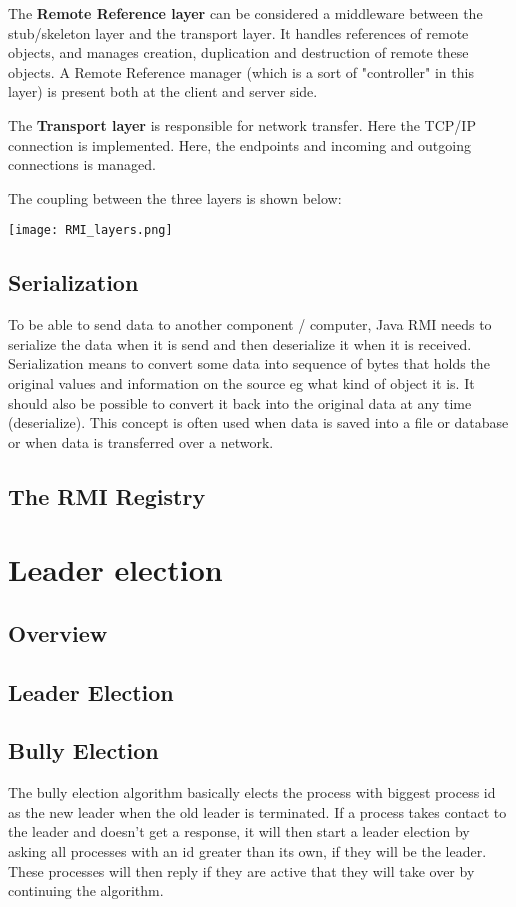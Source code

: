 The \textbf{Remote Reference layer} can be considered a middleware between the stub/skeleton layer and the transport layer. It handles references of remote objects, and manages creation, duplication and destruction of remote these objects. A Remote Reference manager (which is a sort of "controller" in this layer) is present both at the client and server side.

The \textbf{Transport layer} is responsible for network transfer. Here the TCP/IP connection is implemented. Here, the endpoints and incoming and outgoing connections is managed.

The coupling between the three layers is shown below:

\begin{center}
	\texttt{[image: RMI\_layers.png]}
\end{center}

\subsection{Serialization}
To be able to send data to another component / computer, Java RMI needs to serialize the data when it is send and then deserialize it when it is received. 
Serialization means to convert some data into sequence of bytes that holds the original values and information on the source eg what kind of object it is. It should also be possible to convert it back into the original data at any time (deserialize). This concept is often used when data is saved into a file or database or when data is transferred over a network.

\subsection{The RMI Registry}

\section{Leader election}
\subsection{Overview}

\subsection{Leader Election}

\subsection{Bully Election}
The bully election algorithm basically elects the process with biggest process id as the new leader when the old leader is terminated. 
If a process takes contact to the leader and doesn't get a response, it will then start a leader election by asking all processes with an id greater than its own, if they will be the leader. These processes will then reply if they are active that they will take over by continuing the algorithm. 

